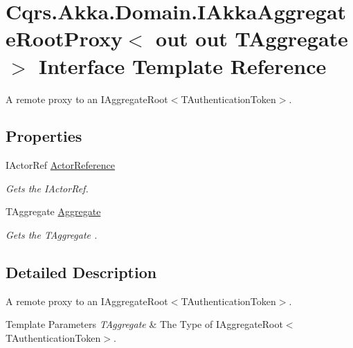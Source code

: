 \hypertarget{interfaceCqrs_1_1Akka_1_1Domain_1_1IAkkaAggregateRootProxy}{}\section{Cqrs.\+Akka.\+Domain.\+I\+Akka\+Aggregate\+Root\+Proxy$<$ out out T\+Aggregate $>$ Interface Template Reference}
\label{interfaceCqrs_1_1Akka_1_1Domain_1_1IAkkaAggregateRootProxy}


A remote proxy to an I\+Aggregate\+Root$<$\+T\+Authentication\+Token$>$.  


\subsection*{Properties}
\begin{DoxyCompactItemize}
\item 
I\+Actor\+Ref \hyperlink{interfaceCqrs_1_1Akka_1_1Domain_1_1IAkkaAggregateRootProxy_a60561a15fa10bec1218bc37d30d8f9a5_a60561a15fa10bec1218bc37d30d8f9a5}{Actor\+Reference}
\begin{DoxyCompactList}\small\item\em Gets the I\+Actor\+Ref. \end{DoxyCompactList}\item 
T\+Aggregate \hyperlink{interfaceCqrs_1_1Akka_1_1Domain_1_1IAkkaAggregateRootProxy_a97a7315b1dd655f9e71e24dfbde514a8_a97a7315b1dd655f9e71e24dfbde514a8}{Aggregate}
\begin{DoxyCompactList}\small\item\em Gets the {\itshape T\+Aggregate} . \end{DoxyCompactList}\end{DoxyCompactItemize}


\subsection{Detailed Description}
A remote proxy to an I\+Aggregate\+Root$<$\+T\+Authentication\+Token$>$. 


\begin{DoxyTemplParams}{Template Parameters}
{\em T\+Aggregate} & The Type of I\+Aggregate\+Root$<$\+T\+Authentication\+Token$>$.\\
\hline
\end{DoxyTemplParams}


